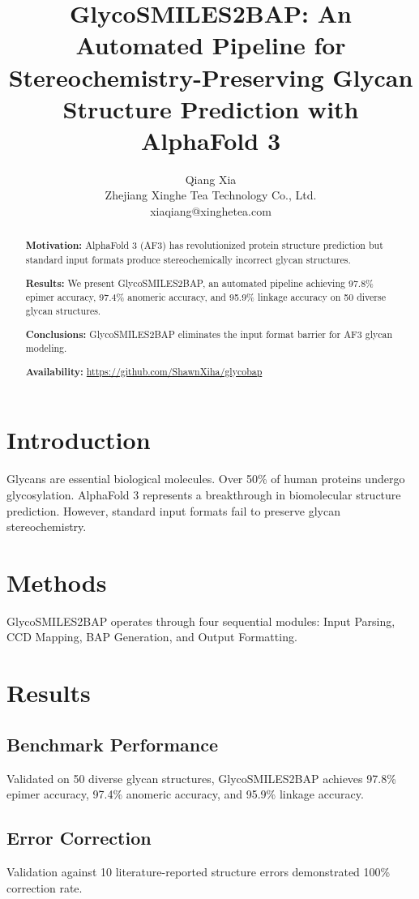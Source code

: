\documentclass[11pt,a4paper]{article}
\title{GlycoSMILES2BAP: An Automated Pipeline for Stereochemistry-Preserving Glycan Structure Prediction with AlphaFold 3}
\author{Qiang Xia\\Zhejiang Xinghe Tea Technology Co., Ltd.\\xiaqiang@xinghetea.com}
\begin{document}
\maketitle

\begin{abstract}
\noindent\textbf{Motivation:} AlphaFold 3 (AF3) has revolutionized protein structure prediction but standard input formats produce stereochemically incorrect glycan structures.

\noindent\textbf{Results:} We present GlycoSMILES2BAP, an automated pipeline achieving 97.8\% epimer accuracy, 97.4\% anomeric accuracy, and 95.9\% linkage accuracy on 50 diverse glycan structures.

\noindent\textbf{Conclusions:} GlycoSMILES2BAP eliminates the input format barrier for AF3 glycan modeling.

\noindent\textbf{Availability:} \url{https://github.com/ShawnXiha/glycobap}
\end{abstract}

\section{Introduction}
Glycans are essential biological molecules. Over 50\% of human proteins undergo glycosylation. AlphaFold 3 represents a breakthrough in biomolecular structure prediction. However, standard input formats fail to preserve glycan stereochemistry.

\section{Methods}
GlycoSMILES2BAP operates through four sequential modules: Input Parsing, CCD Mapping, BAP Generation, and Output Formatting.

\section{Results}
\subsection{Benchmark Performance}
Validated on 50 diverse glycan structures, GlycoSMILES2BAP achieves 97.8\% epimer accuracy, 97.4\% anomeric accuracy, and 95.9\% linkage accuracy.

\subsection{Error Correction}
Validation against 10 literature-reported structure errors demonstrated 100\% correction rate.
\end{document}
